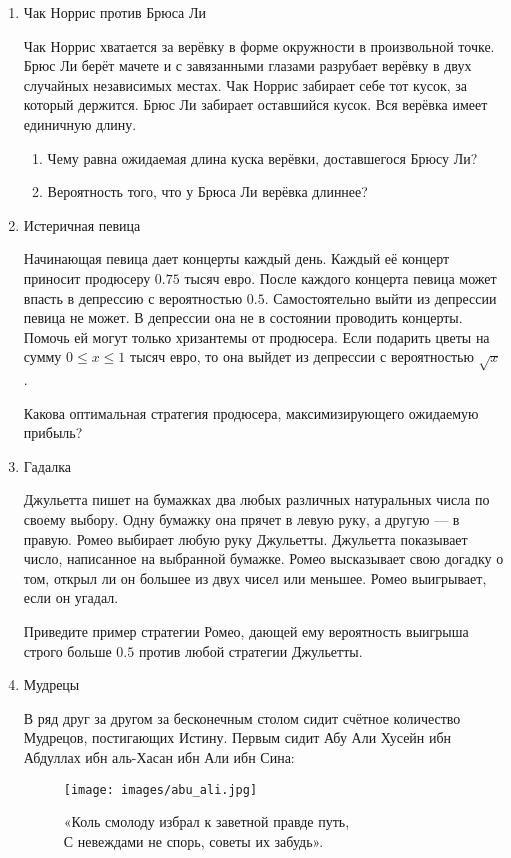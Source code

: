 \begin{enumerate}
\item Чак Норрис против Брюса Ли

Чак Норрис хватается за верёвку в форме окружности в произвольной точке.
Брюс Ли берёт мачете и с завязанными глазами разрубает верёвку в двух случайных
независимых местах. Чак Норрис забирает себе тот кусок, за который держится.
Брюс Ли забирает оставшийся кусок.  Вся верёвка имеет единичную длину.
\begin{enumerate}
\item Чему равна ожидаемая длина куска верёвки, доставшегося Брюсу Ли?
\item  Вероятность того, что у Брюса Ли верёвка длиннее?
\end{enumerate}

\item Истеричная певица

Начинающая певица дает концерты каждый день. Каждый её концерт приносит продюсеру
$0.75$ тысяч евро. После каждого концерта певица может впасть в депрессию
с вероятностью $0.5$. Самостоятельно выйти из депрессии певица не может.
В депрессии она не в состоянии проводить концерты. Помочь ей могут только хризантемы
от продюсера. Если подарить цветы на сумму $0\le x\le 1$ тысяч евро, то она выйдет
из депрессии с вероятностью $\sqrt{x}$.

Какова оптимальная стратегия продюсера, максимизирующего ожидаемую прибыль?

\item Гадалка

Джульетта пишет на бумажках два любых различных натуральных числа по своему выбору.
Одну бумажку она прячет в левую руку, а другую — в правую. Ромео выбирает любую руку
Джульетты. Джульетта показывает число, написанное на выбранной бумажке. Ромео высказывает
свою догадку о том, открыл ли он большее из двух чисел или меньшее. Ромео выигрывает,
если он угадал.

Приведите пример стратегии Ромео, дающей ему вероятность выигрыша строго больше
$0.5$ против любой стратегии Джульетты.

\item Мудрецы

В ряд друг за другом за бесконечным столом сидит счётное количество Мудрецов,
постигающих Истину. Первым сидит Абу Али Хусейн ибн Абдуллах ибн аль-Хасан ибн
Али ибн Сина:

\begin{figure}[h!]
  \begin{center}
\texttt{[image: images/abu\_ali.jpg]}
  \caption*{«Коль смолоду избрал к заветной правде путь, \\
 С невеждами не спорь, советы их забудь». }
 \end{center}
\end{figure}


\end{enumerate}
